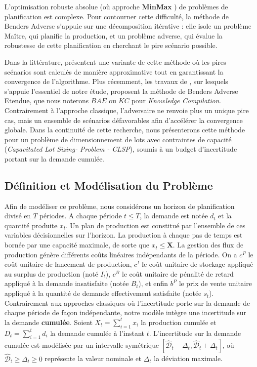\documentclass[12pt, a4paper, twoside]{report}
\numberwithin{equation}{section}
\newcommand{\mmx}{\textbf{MinMax} }
\begin{document}
	L'optimisation robuste absolue (où approche \mmx) de problèmes de planification est complexe. Pour contourner cette difficulté, la méthode de Benders Adverse s'appuie sur une décomposition itérative : elle isole un problème Maître, qui planifie la production, et un problème adverse, qui évalue la robustesse de cette planification en cherchant le pire scénario possible.
	
	Dans la littérature, \cite{PATZOLD202020} présentent une variante de cette méthode où les pires scénarios sont calculés de manière approximative tout en garantissant la convergence de l'algorithme. Plus récemment, les travaux de \cite{portoleau:hal-03595446}, sur lesquels s'appuie l'essentiel de notre étude, proposent la méthode de Benders Adverse Etendue, que nous noterons $BAE$ ou $KC$ pour \textit{Knowledge Compilation}. Contrairement à l'approche classique, l'adversaire ne renvoie plus un unique pire cas, mais un ensemble de scénarios défavorables afin d'accélérer la convergence globale. Dans la continuité de cette recherche, nous présenterons cette méthode pour un problème de dimensionnement de lots avec contraintes de capacité (\textit{Capacitated Lot Sizing- Problem - CLSP}), soumis à un budget d'incertitude portant sur la demande cumulée.
	
	\subsection{Définition et Modélisation du Problème}
	
	Afin de modéliser ce problème, nous considérons un horizon de planification divisé en $T$ périodes. A chaque période $t\leq T$, la demande est notée $d_t$ et la quantité produite $x_t$. Un plan de production est constitué par l'ensemble de ces variables décisionnelles sur l'horizon. La production à chaque pas de temps est bornée par une capacité maximale, de sorte que $x_t\leq \mathbf{X}$. La gestion des flux de production génère différents coûts linéaires indépendants de la période. On a $c^P$ le coût unitaire de lancement de production, $c^I$ le coût unitaire de stockage appliqué au surplus de production (noté $I_t$), $c^B$ le coût unitaire de pénalité de retard appliqué à la demande insatisfaite (notée $B_t$), et enfin $b^P$ le prix de vente unitaire appliqué à la quantité de demande effectivement satisfaite (notée $s_t$). Contrairement aux approches classiques où l'incertitude porte sur la demande de chaque période de façon indépendante, notre modèle intègre une incertitude sur la demande \textbf{cumulée}. Soient $X_t = \sum_{i=1}^{t}x_i$ la production cumulée et $D_t = \sum_{i=1}^{t}d_i$ la demande cumulée à l'instant $t$. L'incertitude sur la demande cumulée est modélisée par un intervalle symétrique  $[\hat{\mathcal{D}}_t - \Delta_t, \hat{\mathcal{D}}_t + \Delta_t]$, où $\hat{\mathcal{D}}_t \geq \Delta_t \geq 0$ représente la valeur nominale et $\Delta_t$ la déviation maximale.
	
\end{document}
